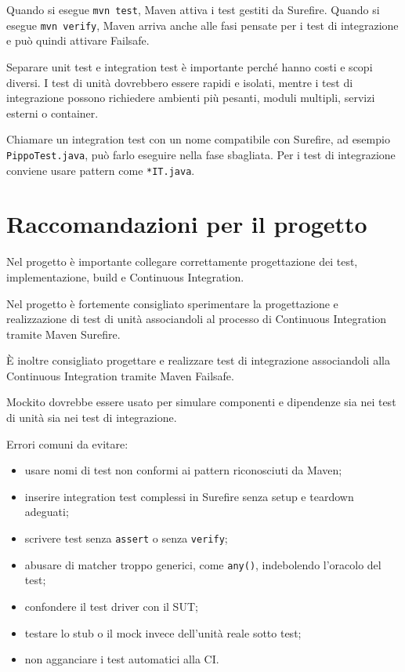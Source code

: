 \begin{notaprof}
Quando si esegue \texttt{mvn test}, Maven attiva i test gestiti da Surefire. Quando si esegue \texttt{mvn verify}, Maven arriva anche alle fasi pensate per i test di integrazione e può quindi attivare Failsafe.
\end{notaprof}

Separare unit test e integration test è importante perché hanno costi e scopi diversi. I test di unità dovrebbero essere rapidi e isolati, mentre i test di integrazione possono richiedere ambienti più pesanti, moduli multipli, servizi esterni o container.

\begin{notaesame}
Chiamare un integration test con un nome compatibile con Surefire, ad esempio \texttt{PippoTest.java}, può farlo eseguire nella fase sbagliata. Per i test di integrazione conviene usare pattern come \texttt{*IT.java}.
\end{notaesame}

\section{Raccomandazioni per il progetto}

Nel progetto è importante collegare correttamente progettazione dei test, implementazione, build e Continuous Integration.

\begin{notaesame}
Nel progetto è fortemente consigliato sperimentare la progettazione e realizzazione di test di unità associandoli al processo di Continuous Integration tramite Maven Surefire.
\end{notaesame}

\begin{notaesame}
È inoltre consigliato progettare e realizzare test di integrazione associandoli alla Continuous Integration tramite Maven Failsafe.
\end{notaesame}

\begin{notaesame}
Mockito dovrebbe essere usato per simulare componenti e dipendenze sia nei test di unità sia nei test di integrazione.
\end{notaesame}

Errori comuni da evitare:

\begin{itemize}
    \item usare nomi di test non conformi ai pattern riconosciuti da Maven;
    \item inserire integration test complessi in Surefire senza setup e teardown adeguati;
    \item scrivere test senza \texttt{assert} o senza \texttt{verify};
    \item abusare di matcher troppo generici, come \texttt{any()}, indebolendo l'oracolo del test;
    \item confondere il test driver con il SUT;
    \item testare lo stub o il mock invece dell'unità reale sotto test;
    \item non agganciare i test automatici alla CI.
\end{itemize}